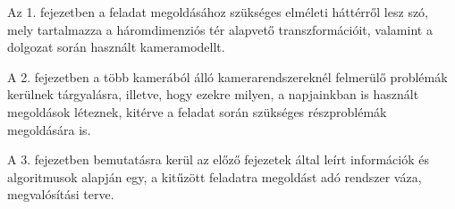 Az 1. fejezetben a feladat megoldásához szükséges elméleti háttérről lesz szó, mely tartalmazza a háromdimenziós tér alapvető transzformációit, valamint a dolgozat során használt kameramodellt.

A 2. fejezetben a több kamerából álló kamerarendszereknél felmerülő problémák kerülnek tárgyalásra, illetve, hogy ezekre milyen, a napjainkban is használt megoldások léteznek, kitérve a feladat során szükséges részproblémák megoldására is.

A 3. fejezetben bemutatásra kerül az előző fejezetek által leírt információk és algoritmusok alapján egy, a kitűzött feladatra megoldást adó rendszer váza, megvalósítási terve. %
